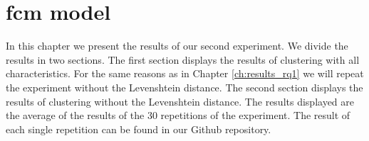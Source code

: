 \documentclass[../../main]{subfiles}
\begin{document}
\section{\acrshort{fcm} model}
\label{ch:results_rq2}
In this chapter we present the results of our second experiment.
We divide the results in two sections. 
The first section displays the results of clustering with all characteristics.
For the same reasons as in Chapter \ref{ch:results_rq1} we will repeat the experiment without the Levenshtein distance.
The second section displays the results of clustering without the Levenshtein distance.
\newline
The results displayed are the average of the results of the 30 repetitions of the experiment.
The result of each single repetition can be found in our Github repository\cite{rbasarat-repo}.
\end{document}
